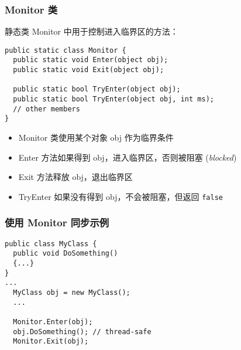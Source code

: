 \begin{frame}[fragile]
\frametitle{Monitor 类}
静态类 Monitor 中用于控制进入临界区的方法：
\begin{lstlisting}
public static class Monitor {
  public static void Enter(object obj);
  public static void Exit(object obj);
 
  public static bool TryEnter(object obj);
  public static bool TryEnter(object obj, int ms);
  // other members
}
\end{lstlisting}

\begin{itemize}
\item Monitor 类使用某个对象 obj 作为临界条件
\item Enter 方法如果得到 obj，进入临界区，否则被阻塞 (\textit{blocked})
\item Exit 方法释放 obj，退出临界区
\item TryEnter 如果没有得到 obj，不会被阻塞，但返回 \texttt{false}
\end{itemize}
\end{frame}

\begin{frame}[fragile]
\frametitle{使用 Monitor 同步示例}
\begin{lstlisting}
public class MyClass {
  public void DoSomething() 
  {...}
}
...
  MyClass obj = new MyClass();
  ...

  Monitor.Enter(obj);
  obj.DoSomething(); // thread-safe
  Monitor.Exit(obj);

\end{lstlisting}
\end{frame}


